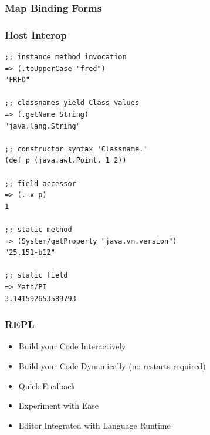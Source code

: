 \documentclass{beamer}
\begin{document}
\begin{frame}
  \frametitle{Map Binding Forms}
\end{frame}



\begin{frame}[fragile]
  \frametitle{Host Interop}
  \begin{verbatim}
;; instance method invocation
=> (.toUpperCase "fred")
"FRED"

;; classnames yield Class values
=> (.getName String)
"java.lang.String"

;; constructor syntax 'Classname.'
(def p (java.awt.Point. 1 2))

;; field accessor
=> (.-x p)
1

;; static method
=> (System/getProperty "java.vm.version")
"25.151-b12"

;; static field
=> Math/PI
3.141592653589793
  \end{verbatim}
\end{frame}

\begin{frame}
  \frametitle{REPL}
  \begin{itemize}
  \item Build your Code Interactively
  \item Build your Code Dynamically (no restarts required)
  \item Quick Feedback
  \item Experiment with Ease
  \item Editor Integrated with Language Runtime
  \end{itemize}
  
\end{frame}
\end{document}
